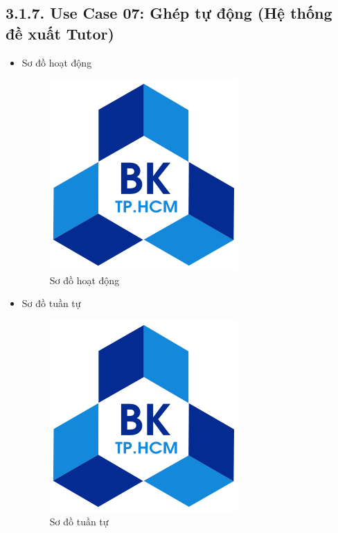 \subsection*{3.1.7. Use Case 07: Ghép tự động (Hệ thống đề xuất Tutor)}
\begin{itemize}
    \item Sơ đồ hoạt động
    \begin{figure}[H]
    \centering
    \includegraphics[scale=0.5 ]{Picture/hcmut.png}
    \caption{Sơ đồ hoạt động }
    \end{figure}
    \item Sơ đồ tuần tự
    \begin{figure}[H]
    \centering
    \includegraphics[scale=0.5 ]{Picture/hcmut.png}
    \caption{Sơ đồ tuần tự }
    \end{figure}
\end{itemize}
